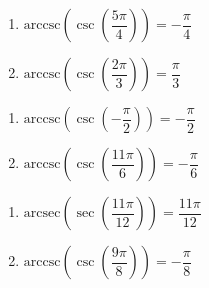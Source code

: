 \begin{multicols}{2}

\begin{enumerate}

\setcounter{enumi}{\value{HW}}

\item  $\text{arccsc}\left(\csc\left(\dfrac{5\pi}{4}\right) \right) = -\dfrac{\pi}{4}$
\item  $\text{arccsc}\left(\csc\left( \dfrac{2\pi}{3} \right) \right) = \dfrac{\pi}{3}$

\setcounter{HW}{\value{enumi}}

\end{enumerate}

\end{multicols}

\begin{multicols}{2}

\begin{enumerate}

\setcounter{enumi}{\value{HW}}

\item  $\text{arccsc}\left(\csc\left(-\dfrac{\pi}{2} \right) \right) = -\dfrac{\pi}{2}$ 
\item  $\text{arccsc}\left(\csc\left(\dfrac{11\pi}{6}\right) \right) = -\dfrac{\pi}{6}$

\setcounter{HW}{\value{enumi}}

\end{enumerate}

\end{multicols}

\begin{multicols}{2}

\begin{enumerate}

\setcounter{enumi}{\value{HW}}

\item  $\text{arcsec}\left(\sec\left(\dfrac{11\pi}{12}\right) \right) = \dfrac{11\pi}{12}$
\item  $\text{arccsc}\left(\csc\left(\dfrac{9\pi}{8}\right) \right) = -\dfrac{\pi}{8}$ 

\setcounter{HW}{\value{enumi}}

\end{enumerate}

\end{multicols}

